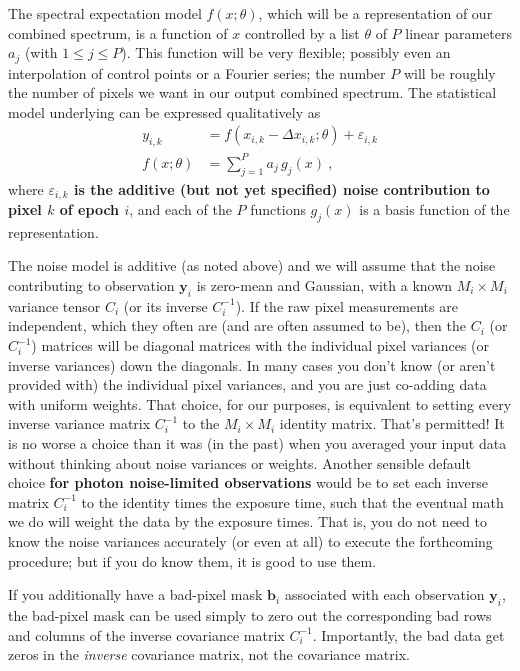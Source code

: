 \documentclass[modern, linenumbers]{aastex631}
\newcommand{\modified}[1]{\textcolor{Emerald}{\textbf{#1}}}
\begin{document}
The spectral expectation model $f(x;\theta)$, which will be a representation of our combined spectrum, is a function of $x$ controlled by a list $\theta$ of $P$ linear parameters $a_j$ (with $1\leq j\leq P$).
This function will be very flexible; possibly even an interpolation of control points or a Fourier series; the number $P$ will be roughly the number of pixels we want in our output combined spectrum.
The statistical model underlying can be expressed qualitatively as
\modified{\begin{align}
    y_{i,k} &= f(x_{i,k} - \Delta x_{i,k};\theta) + \varepsilon_{i,k} \\
    f(x;\theta) &= \sum_{j=1}^P a_j\,g_j(x) ~,
\end{align}}
where \modified{$\varepsilon_{i,k}$ is the additive (but not yet specified) noise contribution to pixel $k$ of epoch $i$}, and each of the $P$ functions $g_j(x)$ is a basis function of the representation.

The noise model is additive (as noted above) and we will assume that the noise contributing to observation \modified{$\mathbf{y}_i$} is zero-mean and Gaussian, with a known $M_i\times M_i$ variance tensor $C_i$ (or its inverse $C_i^{-1}$).
If the raw pixel measurements are independent, which they often are (and are often assumed to be), then the $C_i$ (or $C_i^{-1}$) matrices will be diagonal matrices with the individual pixel variances (or inverse variances) down the diagonals.
In many cases you don't know (or aren't provided with) the individual pixel variances, and you are just co-adding data with uniform weights.
That choice, for our purposes, is equivalent to setting every inverse variance matrix $C_i^{-1}$ to the $M_i\times M_i$ identity matrix.
That's permitted!
It is no worse a choice than it was (in the past) when you averaged your input data without thinking about noise variances or weights.
Another sensible default choice \modified{for photon noise-limited observations} would be to set each inverse matrix $C_i^{-1}$ to the identity times the exposure time, such that the eventual math we do will weight the data by the exposure times.
That is, you do not need to know the noise variances accurately (or even at all) to execute the forthcoming procedure; but if you do know them, it is good to use them.

If you additionally have a bad-pixel mask \modified{$\mathbf{b}_i$} associated with each observation \modified{$\mathbf{y}_i$}, the bad-pixel mask can be used simply to zero out the corresponding bad rows and columns of the inverse covariance matrix $C_i^{-1}$.
Importantly, the bad data get zeros in the \emph{inverse} covariance matrix, not the covariance matrix.
\end{document}
